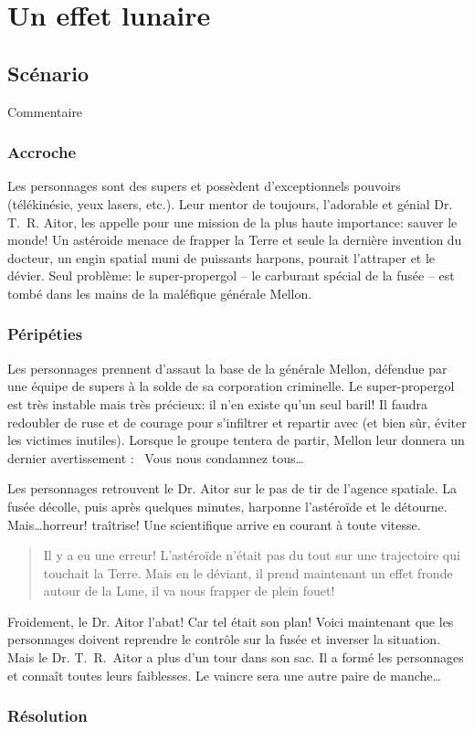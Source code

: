 \chapter{Un effet lunaire}

\section{Scénario}

Commentaire

\subsection{Accroche}

Les personnages sont des supers et possèdent d'exceptionnels pouvoirs (télékinésie, yeux lasers, etc.).
Leur mentor de toujours, l'adorable et génial Dr. T. R. Aitor, les appelle pour une mission de la plus haute importance: sauver le monde!
Un astéroide menace de frapper la Terre et seule la dernière invention du docteur, un engin spatial muni de puissants harpons, pourait l'attraper et le dévier.
Seul problème: le super-propergol -- le carburant spécial de la fusée -- est tombé dans les mains de la maléfique générale Mellon.

\subsection{Péripéties}

Les personnages prennent d'assaut la base de la générale Mellon, défendue par une équipe de supers à la solde de sa corporation criminelle.
Le super-propergol est très instable mais très précieux: il n'en existe qu'un seul baril!
Il faudra redoubler de ruse et de courage pour s'infiltrer et repartir avec (et bien sûr, éviter les victimes inutiles).
Lorsque le groupe tentera de partir, Mellon leur donnera un dernier avertissement : \og Vous nous condamnez tous\dots \fg

Les personnages retrouvent le Dr. Aitor sur le pas de tir de l'agence spatiale.
La fusée décolle, puis après quelques minutes, harponne l'astéroïde et le détourne.
Mais\dots horreur! traîtrise!
Une scientifique arrive en courant à toute vitesse.
\blockquote{Il y a eu une erreur! L'astéroïde n'était pas du tout sur une trajectoire qui touchait la Terre. Mais en le déviant, il prend maintenant un effet fronde autour de la Lune, il va nous frapper de plein fouet!}
Froidement, le Dr. Aitor l'abat! Car tel était son plan!
Voici maintenant que les personnages doivent reprendre le contrôle sur la fusée et inverser la situation.
Mais le Dr. T. R. Aitor a plus d'un tour dans son sac.
Il a formé les personnages et connaît toutes leurs faiblesses.
Le vaincre sera une autre paire de manche\dots

\subsection{Résolution}

